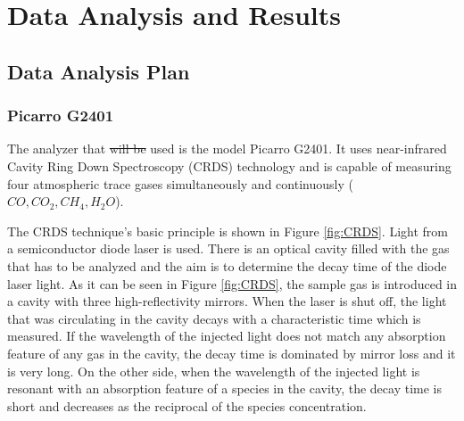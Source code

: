\documentclass[a4paper,12pt,oneside]{article}
\providecommand{\DIFaddtex}[1]{{\protect\color{blue}\uwave{#1}}} %
\providecommand{\DIFdeltex}[1]{{\protect\color{red}\sout{#1}}}                      %
\providecommand{\DIFaddbegin}{} %
\providecommand{\DIFaddend}{} %
\providecommand{\DIFdelbegin}{} %
\providecommand{\DIFdelend}{} %
\providecommand{\DIFadd}[1]{\texorpdfstring{\DIFaddtex{#1}}{#1}} %
\providecommand{\DIFdel}[1]{\texorpdfstring{\DIFdeltex{#1}}{}} %
\newcommand{\DIFscaledelfig}{0.5}
\newlength{\DIFdelgraphicswidth} %
\newlength{\DIFdelgraphicsheight} %
\newcommand{\DIFaddincludegraphics}[2][]{{\color{blue}\fbox{\DIFOincludegraphics[#1]{#2}}}} %
\newcommand{\DIFdelincludegraphics}[2][]{%
\sbox{\DIFdelgraphicsbox}{\DIFOincludegraphics[#1]{#2}}%
\settoboxwidth{\DIFdelgraphicswidth}{\DIFdelgraphicsbox} %
\settoboxtotalheight{\DIFdelgraphicsheight}{\DIFdelgraphicsbox} %
\scalebox{\DIFscaledelfig}{%
\parbox[b]{\DIFdelgraphicswidth}{\usebox{\DIFdelgraphicsbox}\\[-\baselineskip] \rule{\DIFdelgraphicswidth}{0em}}\llap{\resizebox{\DIFdelgraphicswidth}{\DIFdelgraphicsheight}{%
\setlength{\unitlength}{\DIFdelgraphicswidth}%
\begin{picture}(1,1)%
\thicklines\linethickness{2pt} %
{\color[rgb]{1,0,0}\put(0,0){\framebox(1,1){}}}%
{\color[rgb]{1,0,0}\put(0,0){\line( 1,1){1}}}%
{\color[rgb]{1,0,0}\put(0,1){\line(1,-1){1}}}%
\end{picture}%
}\hspace*{3pt}}} %
} %
\DeclareRobustCommand{\DIFaddbegin}{\DIFOaddbegin \let\includegraphics\DIFaddincludegraphics} %
\DeclareRobustCommand{\DIFaddend}{\DIFOaddend \let\includegraphics\DIFOincludegraphics} %
\DeclareRobustCommand{\DIFdelbegin}{\DIFOdelbegin \let\includegraphics\DIFdelincludegraphics} %
\DeclareRobustCommand{\DIFdelend}{\DIFOaddend \let\includegraphics\DIFOincludegraphics} %
\begin{document}



\pagebreak
\section{Data Analysis and Results}

\subsection{Data Analysis Plan}\DIFaddbegin \label{sec:data-analysis-plan}
\DIFaddend 

\subsubsection{Picarro G2401}

The analyzer that \DIFdelbegin \DIFdel{will be }\DIFdelend \DIFaddbegin \DIFadd{was }\DIFaddend used is the model Picarro G2401. It uses near-infrared Cavity Ring Down Spectroscopy (CRDS) technology and is capable of measuring four atmospheric trace gases simultaneously and continuously ($CO, CO_2, CH_4, H_2O$).

The CRDS technique's basic principle is shown in Figure \ref{fig:CRDS}. Light from a semiconductor diode laser is used. There is an optical cavity filled with the gas that has to be analyzed and the aim is to determine the decay time of the diode laser light. As it can be seen in Figure \ref{fig:CRDS}, the sample gas is introduced in a cavity with three high-reflectivity mirrors. When the laser is shut off, the light that was circulating in the cavity decays with a characteristic time which is measured. If the wavelength of the injected light does not match any absorption feature of any gas in the cavity, the decay time is dominated by mirror loss and it is very long. On the other side, when the wavelength of the injected light is resonant with an absorption feature of a species in the cavity, the decay time is short and decreases as the reciprocal of the species concentration.
\end{document}
